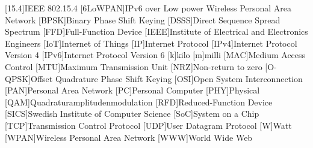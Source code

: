 \begin{acronym}[6LoWPAN]
	[15.4]{IEEE 802.15.4}
	[6LoWPAN]{IPv6 over Low power Wireless Personal Area Network}
	[BPSK]{Binary Phase Shift Keying}
	[DSSS]{Direct Sequence Spread Spectrum}
	[FFD]{Full-Function Device}
	[IEEE]{Institute of Electrical and Electronics Engineers}
	[IoT]{Internet of Things}
	[IP]{Internet Protocol}
	[IPv4]{Internet Protocol Version 4}
	[IPv6]{Internet Protocol Version 6}
	{kilo}
	{milli}
	[MAC]{Medium Access Control}
	[MTU]{Maximum Transmission Unit}
	[NRZ]{Non-return to zero}
	[O-QPSK]{Offset Quadrature Phase Shift Keying}
	[OSI]{Open System Interconnection}
	[PAN]{Personal Area Network}
	[PC]{Personal Computer}
	[PHY]{Physical}
	[QAM]{Quadraturamplitudenmodulation}
	[RFD]{Reduced-Function Device}
	[SICS]{Swedish Institute of Computer Science}
	[SoC]{System on a Chip}
	[TCP]{Transmission Control Protocol}
	[UDP]{User Datagram Protocol}
	{Watt}
	[WPAN]{Wireless Personal Area Network}
	[WWW]{World Wide Web}
\end{acronym}